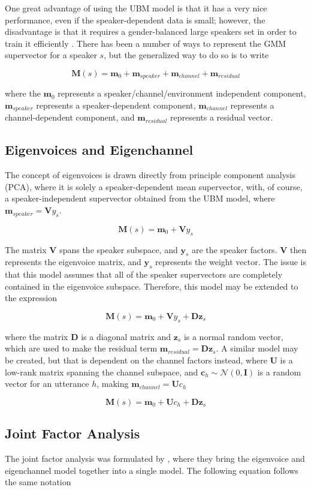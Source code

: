 One great advantage of using the UBM model is that it has a very nice performance, even if the speaker-dependent data is small; however, the disadvantage is that it requires a gender-balanced large speakers set in order to train it efficiently \cite{advantageUBM}. There has been a number of ways to represent the GMM supervector for a speaker $s$, but the generalized way to do so is to write

$$\bm{M}(s) = \bm{m}_0 + \bm{m}_{speaker} + \bm{m}_{channel} + \bm{m}_{residual}$$

where the $\bm{m}_0$ represents a speaker/channel/environment independent component, $\bm{m}_{speaker}$ represents a speaker-dependent component, $\bm{m}_{channel}$ represents a channel-dependent component, and $\bm{m}_{residual}$ represents a residual vector.

\subsection{Eigenvoices and Eigenchannel}
The concept of eigenvoices is drawn directly from principle component analysis (PCA), where it is solely a speaker-dependent mean supervector, with, of course, a speaker-independent supervector obtained from the UBM model, where $\bm{m}_{speaker} = \bm{V}{y}_s$.

$$\bm{M}(s) = \bm{m}_0 + \bm{V}{y}_s$$

The matrix $\bm{V}$ spans the speaker subspace, and $\bm{y}_s$ are the speaker factors. $\bm{V}$ then represents the eigenvoice matrix, and $\bm{y}_s$ represents the weight vector. The issue is that this model assumes that all of the speaker supervectors are completely contained in the eigenvoice subspace. Therefore, this model may be extended to the expression

$$\bm{M}(s) = \bm{m}_0 + \bm{V}{y}_s + \bm{D}\bm{z}_s$$

where the matrix $\bm{D}$ is a diagonal matrix and $\bm{z}_s$ is a normal random vector, which are used to make the residual term $\bm{m}_{residual} = \bm{Dz}_s$. A similar model may be created, but that is dependent on the channel factors instead, where $\bm{U}$ is a low-rank matrix spanning the channel subspace, and $\bm{c}_h\sim \mathcal{N}(0,\bm{I})$ is a random vector for an utterance $h$, making $\bm{m}_{channel} = \bm{U}{c}_h$

$$\bm{M}(s) = \bm{m}_0 + \bm{U}{c}_h + \bm{D}\bm{z}_s$$

\subsection{Joint Factor Analysis}
The joint factor analysis was formulated by \cite{JFA1}, where they bring the eigenvoice and eigenchannel model together into a single model. The following equation follows the same notation


